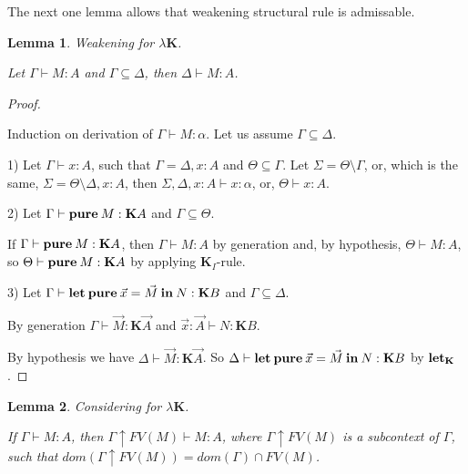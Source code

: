 \documentclass[a4paper]{article}
\newtheorem{lemma}{Lemma}
\begin{document}
  \vspace{\baselineskip}

  The next one lemma allows that weakening structural rule is admissable.

  \begin{lemma} Weakening for $\lambda \textbf{K}$.

  Let $\Gamma \vdash M : A$ and $\Gamma \subseteq \Delta$, then $\Delta \vdash M : A$.

  \end{lemma}

  \begin{proof}

  $ $

  Induction on derivation of $\Gamma \vdash M : \alpha$. Let us assume $\Gamma \subseteq \Delta$.

  1) Let $\Gamma \vdash x : A$, such that $\Gamma = \Delta, x : A$ and $\Theta \subseteq \Gamma$.
  Let $\Sigma = \Theta \setminus \Gamma$, or, which is the same, $\Sigma = \Theta \setminus \Delta, x :
  A$, then $\Sigma, \Delta, x : A \vdash x : \alpha$, or, $\Theta \vdash x : A$.

  2) Let $\Gamma \vdash {\bf pure \: } M : \textbf{K}A$ and $\Gamma \subseteq \Theta$.

  If $\Gamma \vdash {\bf pure \: } M : \textbf{K}A$, then $\Gamma \vdash M : A$ by generation and, by
  hypothesis, $\Theta \vdash M : A$, so $\Theta \vdash {\bf pure \: } M : \textbf{K}A$ by applying
  $\textbf{K}_I$-rule.

  3) Let $\Gamma \vdash {\bf let \: pure \:} \vec{x} = \vec{M} {\bf \: in \:} N : \textbf{K}B$ and $\Gamma \subseteq \Delta$.

  By generation $\Gamma \vdash \vec{M} : \textbf{K}\vec{A}$ and $\vec{x} : \vec{A} \vdash N : \textbf{K}B$.

  By hypothesis we have $\Delta \vdash \vec{M} : \textbf{K}\vec{A}$. So $\Delta \vdash {\bf let \: pure \:} \vec{x} = \vec{M} {\bf \: in \:} N : \textbf{K}B$ by ${\bf let}_{\textbf{K}}$.

  \end{proof}

  \begin{lemma} Considering for $\lambda \textbf{K}$.

  If $\Gamma \vdash M : A$, then $\Gamma \uparrow FV(M) \vdash M : A$, where $\Gamma \uparrow
  FV(M)$ is a subcontext of $\Gamma$, such that $dom(\Gamma \uparrow FV(M)) = dom(\Gamma) \cap FV(M)$.

  \end{lemma}
\end{document}
